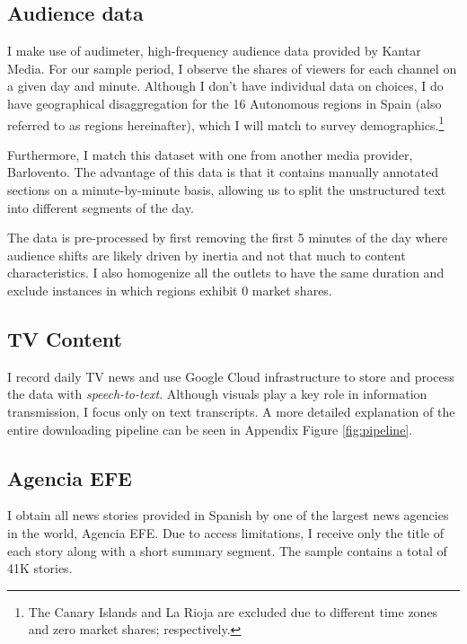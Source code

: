 \documentclass[12pt]{article}
\begin{document}
	
	
	\subsection*{Audience data }
	
	
	I make use of audimeter, high-frequency audience data provided by Kantar Media. For our sample period, I  observe the shares of viewers for each channel on a given day and minute. Although I don't have individual data on choices, I do have geographical disaggregation for the 16 Autonomous regions in Spain (also referred to as regions hereinafter), which I will match to survey demographics.\footnote{The Canary Islands and La Rioja are excluded due to different time zones and zero market shares; respectively.}
	
	Furthermore, I match this dataset with one from another media provider, Barlovento. The advantage of this data is that it contains manually annotated sections on a minute-by-minute basis, allowing us to split the unstructured text into different segments of the day. 
	
	The data is pre-processed by first removing the first 5 minutes of the day where audience shifts are likely driven by inertia and not that much to content characteristics. I also homogenize all the outlets to have the same duration and exclude instances in which regions exhibit 0 market shares. 
	
	
	
	\subsection*{TV Content}
	
	I record daily TV news and use Google Cloud infrastructure to store and process the data with \textit{speech-to-text}. Although visuals play a key role in information transmission, I focus only on text transcripts. A more detailed explanation of the entire downloading pipeline can be seen in Appendix Figure \ref{fig:pipeline}.
	
	
	\subsection*{Agencia EFE}
	
	I obtain all news stories provided in Spanish by one of the largest news agencies in the world, Agencia EFE. Due to access limitations, I receive only the title of each story along with a short summary segment. The sample contains a total of 41K stories.
	
\end{document}
